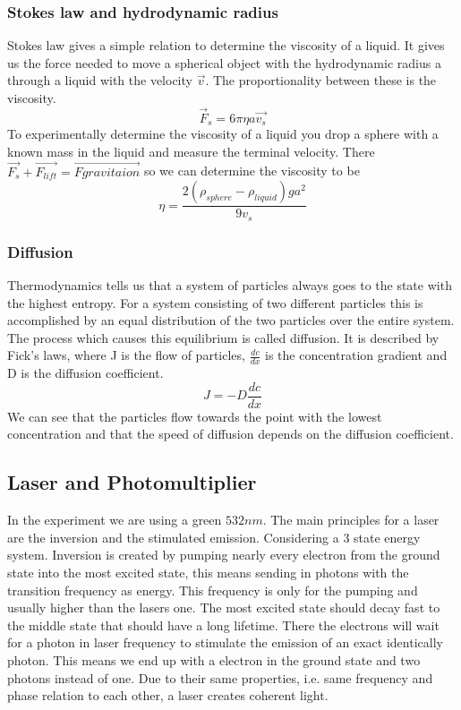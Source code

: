 \documentclass[]{article}
\begin{document}
\subsubsection{Stokes law and hydrodynamic radius}
Stokes law gives a simple relation to determine the viscosity of a liquid. It gives us the force needed to move a spherical object with the hydrodynamic radius a through a liquid with the velocity $\vec{v}$. The proportionality between these is the viscosity.
\begin{equation}\label{eq:Stokes}
	\vec{F}_s=6 \pi \eta a \vec{v_s}
\end{equation}
To experimentally determine the viscosity of a liquid you drop a sphere with a known mass in the liquid and measure the terminal velocity. There $\vec{F_s}+\vec{F_{lift}}=\vec{F{gravitaion}}$ so we can determine the viscosity to be
\begin{equation}
	\eta=\frac{2(\rho_{sphere}-\rho_{liquid})g  a^2}{9v_s}
\end{equation} 


\subsubsection{Diffusion}
Thermodynamics tells us that a system of particles always goes to the state with the highest entropy. For a system consisting of two different particles this is accomplished by an equal distribution of the two particles over the entire system. The process which causes this equilibrium is called diffusion. It is described by Fick's laws, where J is the flow of particles, $\frac{dc}{dx} $ is the concentration gradient and D is the diffusion coefficient. 
\[ J=-D\frac{dc}{dx}\]
We can see that the particles flow towards the point with the lowest concentration and that the speed of diffusion depends on the diffusion coefficient.

\subsection{Laser and Photomultiplier}
In the experiment we are using a green $532nm$. The main principles for a laser are the inversion and the stimulated emission. Considering a 3 state energy system. Inversion is created by pumping nearly every electron from the ground state into the most excited state, this means sending in photons with the transition frequency as energy. This frequency is only for the pumping and usually higher than the lasers one. The most excited state should decay fast to the middle state that should have a long lifetime. There the electrons will wait for a photon in laser frequency to stimulate the emission of an exact identically photon. This means we end up with a electron in the ground state and two photons instead of one. Due to their same properties, i.e. same frequency and phase relation to each other, a laser creates coherent light.
\end{document}
